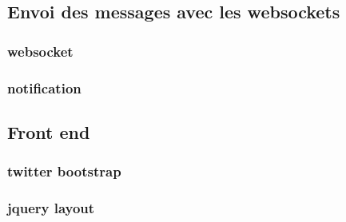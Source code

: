 \subsection{Envoi des messages avec les websockets}



\subsubsection{websocket}

\subsubsection{notification}



\subsection{Front end}



\subsubsection{twitter bootstrap}

\subsubsection{jquery layout}



